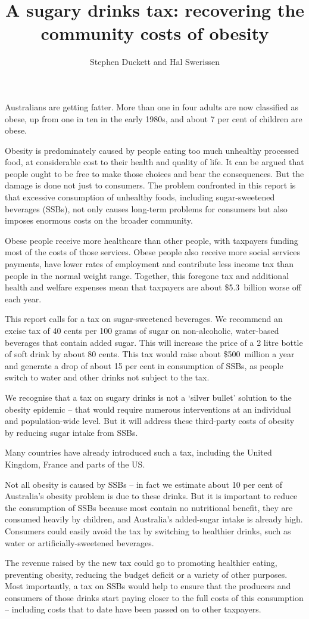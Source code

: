 \documentclass[embargoed]{grattan}
\title{A sugary drinks tax: recovering the community costs of obesity}
\author{Stephen Duckett and Hal Swerissen}
\begin{document}
\begin{overview}

Australians are getting fatter.
More than one in four adults are now classified as obese, up from one in ten in the early 1980s, and about 7 per cent of children are obese.

Obesity is predominately caused by people eating too much unhealthy processed food, at considerable cost to their health and quality of life.
It can be argued that people ought to be free to make those choices and bear the consequences.
But the damage is done not just to consumers.
The problem confronted in this report is that excessive consumption of unhealthy foods, including sugar-sweetened beverages (SSBs), not only causes long-term problems for consumers but also imposes enormous costs on the broader community.

Obese people receive more healthcare than other people, with taxpayers funding most of the costs of those services.
Obese people also receive more social services payments, have lower rates of employment and contribute less income tax than people in the normal weight range.
Together, this foregone tax and additional health and welfare expenses mean that taxpayers are about \$5.3~billion worse off each year. 

This report calls for a tax on sugar-sweetened beverages.
We recommend an excise tax of 40 cents per 100 grams of sugar on non-alcoholic, water-based beverages that contain added sugar.
This will increase the price of a 2 litre bottle of soft drink by about 80 cents.
This tax would raise about \$500~million a year and generate a drop of about 15 per cent in consumption of SSBs, as people switch to water and other drinks not subject to the tax. 

We recognise that a tax on sugary drinks is not a ‘silver bullet’ solution to the obesity epidemic – that would require numerous interventions at an individual and population-wide level.
But it will address these third-party costs of obesity by reducing sugar intake from SSBs.

Many countries have already introduced such a tax, including the United Kingdom, France and parts of the US.

Not all obesity is caused by SSBs – in fact we estimate about 10 per cent of Australia’s obesity problem is due to these drinks.
But it is important to reduce the consumption of SSBs because most contain no nutritional benefit, they are consumed heavily by children, and Australia’s added-sugar intake is already high.
Consumers could easily avoid the tax by switching to healthier drinks, such as water or artificially-sweetened beverages.

The revenue raised by the new tax could go to promoting healthier eating, preventing obesity, reducing the budget deficit or a variety of other purposes.
Most importantly, a tax on SSBs would help to ensure that the producers and consumers of those drinks start paying closer to the full costs of this consumption – including costs that to date have been passed on to other taxpayers.



\end{overview}
\end{document}
